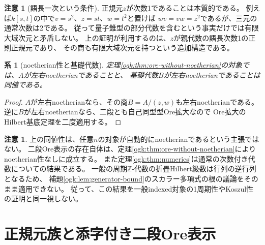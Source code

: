 \documentclass[11pt,a4paper]{ltjsarticle}
\newtheorem{corollary}[theorem]{系}
\theoremstyle{definition}
\newtheorem{remark}[theorem]{注意}
\begin{document}
\begin{remark}[語長一次という条件]
正規元$z$が次数1であることは本質的である。
例えば$k[s,t]$の中で$v=s^2$、$z=st$、$w=t^2$と置けば
$wv=vw=z^2$であるが、三元の通常次数は2である。
従って量子錐型の部分代数を含むという事実だけでは有限大域次元と矛盾しない。
上の証明が利用するのは、$z$が親代数の語長次数1の正則正規元であり、
その商も有限大域次元を持つという追加構造である。
\end{remark}

\begin{corollary}[noetherian性と基礎代数]\label{ogk:cor:noetherian-ore}
定理\ref{ogk:thm:ore-without-noetherian}の対象では、$A$が左右noetherianであることと、
基礎代数$B$が左右noetherianであることは同値である。
\end{corollary}
\begin{proof}
$A$が左右noetherianなら、その商$B=A/(z,w)$も左右noetherianである。
逆に$B$が左右noetherianなら、二段とも自己同型型Ore拡大なので
Ore拡大のHilbert基底定理を二度適用する。
\end{proof}

\begin{remark}
上の同値性は、任意$n$の対象が自動的にnoetherianであるという主張ではない。
二段Ore表示の存在自体は、定理\ref{ogk:thm:ore-without-noetherian}によりnoetherian性なしに成立する。
また定理\ref{ogk:thm:numerics}は通常の次数付き代数についての結果である。
一般の周期$\mathbb Z$-代数の折畳Hilbert級数は行列の逆行列となるため、
補題\ref{ogk:lem:generator-bound}のスカラー多項式の根の議論をそのまま適用できない。
従って、この結果を一般indexed対象の1周期性やKoszul性の証明と同一視しない。
\end{remark}


\section{正規元族と添字付き二段Ore表示}\label{ibar:sec:normal-z}
\end{document}

